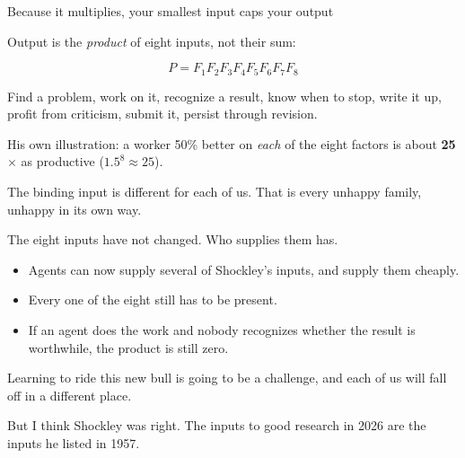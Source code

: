 \documentclass[aspectratio=169,11pt]{beamer}
\begin{document}
\begin{frame}{Because it multiplies, your smallest input caps your output}

Output is the \emph{product} of eight inputs, not their sum:

\vspace{0.1cm}
\begin{center}
\[
P = F_1 F_2 F_3 F_4 F_5 F_6 F_7 F_8
\]
\end{center}
\vspace{0.02cm}

Find a problem, work on it, recognize a result, know when to stop, write it up, profit from criticism, submit it, persist through revision.

\vspace{0.18cm}

{\footnotesize\color{warmgray} His own illustration: a worker 50\% better on \emph{each} of the eight factors is about \textbf{25$\times$} as productive ($1.5^{8}\approx 25$).}

\vspace{0.18cm}

\alert{The binding input is different for each of us. That is every unhappy family, unhappy in its own way.}

\end{frame}

\begin{frame}{The eight inputs have not changed. Who supplies them has.}

\begin{itemize}\setlength\itemsep{0.4em}
    \item Agents can now supply several of Shockley's inputs, and supply them cheaply.
    \item Every one of the eight still has to be present.
    \item If an agent does the work and nobody recognizes whether the result is worthwhile, the product is still zero.
\end{itemize}

\vspace{0.35cm}

Learning to ride this new bull is going to be a challenge, and each of us will fall off in a different place.

\vspace{0.3cm}

\alert{But I think Shockley was right. The inputs to good research in 2026 are the inputs he listed in 1957.}

\end{frame}
\end{document}
